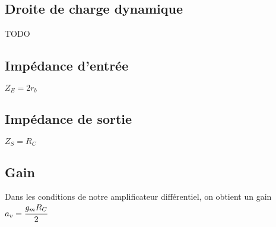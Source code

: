    \subsection{Droite de charge dynamique}
    TODO
    




   \subsection{Impédance d'entrée}
    $Z_E = 2 r_b$

   \subsection{Impédance de sortie}
    $Z_S = R_C$

   \subsection{Gain}
    Dans les conditions de notre amplificateur différentiel, on obtient un gain 
    $a_v = \cfrac{g_m R_C}{2}$
